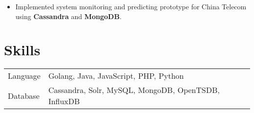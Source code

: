 \documentclass[10pt, letterpaper]{simple-cv}
\begin{document}
\begin{itemize}
\item Implemented system monitoring and predicting prototype for China Telecom using \textbf{Cassandra} and \textbf{MongoDB}.
\end{itemize}


\section{Skills}
\begin{tabular}{ l l }
 Language &  Golang, Java, JavaScript, PHP, Python\\
 Database & Cassandra, Solr, MySQL, MongoDB, OpenTSDB, InfluxDB\\
\end{tabular}
\end{document}
